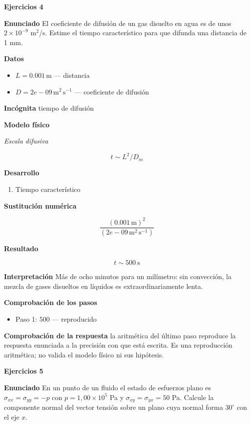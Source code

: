 \documentclass[10pt,openany]{book}
\begin{document}
\noindent\textbf{Ejercicios 4}

\noindent\textbf{Enunciado}
El coeficiente de difusión de un gas disuelto en agua es de unos \(2\times 10^{-9}\) m\(^2\)/s. Estime el tiempo característico para que difunda una distancia de 1 mm.

\noindent\textbf{Datos}
\begin{itemize}
\item $L = 0.001\,\mathrm{m}$ — distancia
\item $D = 2e-09\,\mathrm{m}^{2}\,\mathrm{s}^{-1}$ — coeficiente de difusión
\end{itemize}

\noindent\textbf{Incógnita}
tiempo de difusión

\noindent\textbf{Modelo físico}

\noindent\textit{Escala difusiva}

\[
t \sim L^{2}/D_m
\]

\noindent\textbf{Desarrollo}
\begin{enumerate}
\item
Tiempo característico
\end{enumerate}

\noindent\textbf{Sustitución numérica}

\[
\frac{\left(0.001\,\mathrm{m}\right)^{2}}{\left(2e-09\,\mathrm{m}^{2}\,\mathrm{s}^{-1}\right)}
\]

\noindent\textbf{Resultado}

\[
t \sim 500\ \mathrm{s}
\]

\noindent\textbf{Interpretación}
Más de ocho minutos para un milímetro: sin convección, la mezcla de gases disueltos en líquidos es extraordinariamente lenta.

\noindent\textbf{Comprobación de los pasos}
\begin{itemize}
\item Paso 1: $500$ — reproducido
\end{itemize}

\noindent\textbf{Comprobación de la respuesta} la aritmética del último paso reproduce la respuesta enunciada a la precisión con que está escrita. Es una reproducción aritmética; no valida el modelo físico ni sus hipótesis.

\noindent\textbf{Ejercicios 5}

\noindent\textbf{Enunciado}
En un punto de un fluido el estado de esfuerzos plano es \(\sigma_{xx} = \sigma_{yy} = -p\) con \(p = 1{,}00\times 10^{5}\) Pa y \(\sigma_{xy} = \sigma_{yx} = 50\) Pa. Calcule la componente normal del vector tensión sobre un plano cuya normal forma \(30^\circ\) con el eje \(x\).
\end{document}
